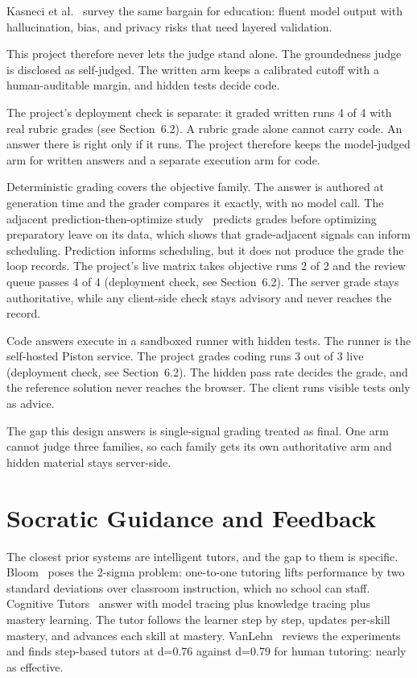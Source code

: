 Kasneci et al.~\cite{kasneci2023} survey the same bargain for education: fluent model output with hallucination, bias, and privacy risks that need layered validation.

This project therefore never lets the judge stand alone. The groundedness judge is disclosed as self-judged. The written arm keeps a calibrated cutoff with a human-auditable margin, and hidden tests decide code.

The project's deployment check is separate: it graded written runs 4 of 4 with real rubric grades (see Section~6.2). A rubric grade alone cannot carry code. An answer there is right only if it runs. The project therefore keeps the model-judged arm for written answers and a separate execution arm for code.

Deterministic grading covers the objective family. The answer is authored at generation time and the grader compares it exactly, with no model call. The adjacent prediction-then-optimize study~\cite{islam2024} predicts grades before optimizing preparatory leave on its data, which shows that grade-adjacent signals can inform scheduling. Prediction informs scheduling, but it does not produce the grade the loop records. The project's live matrix takes objective runs 2 of 2 and the review queue passes 4 of 4 (deployment check, see Section~6.2). The server grade stays authoritative, while any client-side check stays advisory and never reaches the record.

Code answers execute in a sandboxed runner with hidden tests. The runner is the self-hosted Piston service. The project grades coding runs 3 out of 3 live (deployment check, see Section~6.2). The hidden pass rate decides the grade, and the reference solution never reaches the browser. The client runs visible tests only as advice.

The gap this design answers is single-signal grading treated as final. One arm cannot judge three families, so each family gets its own authoritative arm and hidden material stays server-side.

\section{Socratic Guidance and Feedback}
The closest prior systems are intelligent tutors, and the gap to them is specific. Bloom~\cite{bloom1984} poses the 2-sigma problem: one-to-one tutoring lifts performance by two standard deviations over classroom instruction, which no school can staff. Cognitive Tutors~\cite{anderson1995} answer with model tracing plus knowledge tracing plus mastery learning. The tutor follows the learner step by step, updates per-skill mastery, and advances each skill at mastery. VanLehn~\cite{vanlehn2011} reviews the experiments and finds step-based tutors at d=0.76 against d=0.79 for human tutoring: nearly as effective.

